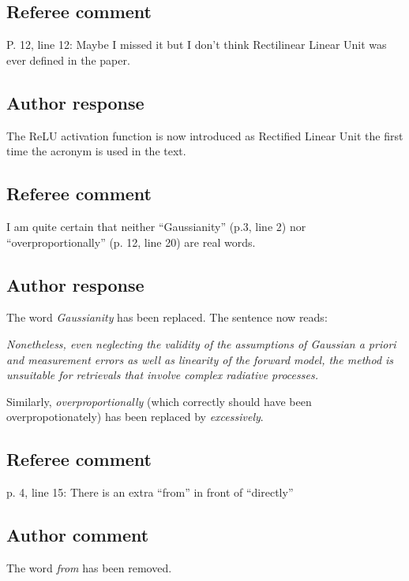 \documentclass[11pt]{scrartcl}
\begin{document}
\subsection*{Referee comment}

P. 12, line 12:  Maybe I missed it but I don’t think Rectilinear Linear Unit was ever
defined in the paper.

\subsection*{Author response}

The ReLU activation function is now introduced as Rectified Linear Unit the
first time the acronym is used in the text.

\subsection*{Referee comment}
I am quite certain that neither “Gaussianity” (p.3, line 2) nor “overproportionally” (p. 12,
line 20) are real words.

\subsection*{Author response}

The word \emph{Gaussianity} has been replaced. The sentence now reads:

\vspace{1em}
\textit{
Nonetheless, even neglecting the validity of the assumptions of Gaussian
a priori and measurement errors as well as linearity of the forward
model, the method is unsuitable for retrievals that involve complex
radiative processes.
}
\vspace{1em}

Similarly, \emph{overproportionally} (which correctly should have been
overpropotionately) has been replaced by \emph{excessively}.

\subsection*{Referee comment}

p. 4, line 15: There is an extra “from” in front of “directly”

\subsection*{Author comment}

The word \emph{from} has been removed.
\end{document}
